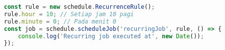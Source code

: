 \begin{lstlisting}[language=Javascript,caption={Penjadwalan dengan Waktu Berulang}]
const rule = new schedule.RecurrenceRule();
rule.hour = 10; // Setiap jam 10 pagi
rule.minute = 0; // Pada menit 0
const job = schedule.scheduleJob('recurringJob', rule, () => {
    console.log('Recurring job executed at', new Date()); 
});
\end{lstlisting}